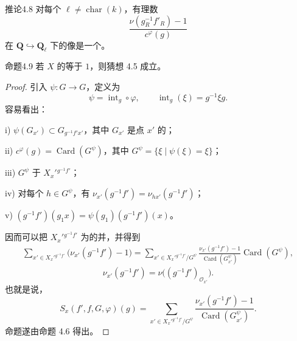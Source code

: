 \begin{SGAresult}{推论}{4.8}
对每个 $\ell\ne\operatorname{char}(k)$，有理数
\[
\frac{\nu(g_R^{-1}f'_R)-1}{c^\varphi(g)}
\]
在 $\mathbf Q\hookrightarrow\mathbf Q_\ell$ 下的像是一个。
\end{SGAresult}

\begin{SGAresult}{命题}{4.9}
若 $X$ 的等于 $1$，则猜想 4.5 成立。
\end{SGAresult}
\begin{proof}
引入 $\psi:G\longrightarrow G$，定义为
\[
\psi=\operatorname{int}_g\circ\varphi,\qquad
\operatorname{int}_g(\xi)=g^{-1}\xi g.
\]
容易看出：

\textup{i)} $\psi(G_{x'})\subset G_{g^{-1}f'x'}$，其中 $G_{x'}$ 是点 $x'$ 的；

\textup{ii)} $c^\varphi(g)=\operatorname{Card}(G^\psi)$，其中
$G^\psi=\{\xi\mid\psi(\xi)=\xi\}$；

\textup{iii)} $G^\psi$ 于 $X_x'{}^{g^{-1}f'}$；

\textup{iv)} 对每个 $h\in G^\psi$，有
$\nu_{x'}(g^{-1}f')=\nu_{hx'}(g^{-1}f')$；

\textup{v)} $(g^{-1}f')(g_1x)=\psi(g_1)(g^{-1}f')(x)$。

因而可以把 $X_x'{}^{g^{-1}f'}$ 为的并，并得到
\[
\begin{aligned}
\sum_{x'\in X_x'{}^{g^{-1}f'}}\bigl(\nu_{x'}(g^{-1}f')-1\bigr)
=\sum_{x'\in X_x'{}^{g^{-1}f'}/G^\psi}
 \frac{\nu_{x'}(g^{-1}f')-1}{\operatorname{Card}(G_{x'}^\psi)}
 \operatorname{Card}(G^\psi),
\end{aligned}
\tag{4.9.1}
\]
\[
\nu_{x'}(g^{-1}f')=\nu\bigl((g^{-1}f')_{\mathscr O_{x'}}\bigr).
\]
也就是说，
\[
S_x(f',f,G,\varphi)(g)
=\sum_{x'\in X_x'{}^{g^{-1}f'}/G^\psi}
 \frac{\nu_{x'}(g^{-1}f')-1}{\operatorname{Card}(G_{x'}^\psi)}.
\tag{4.9.2}
\]
命题遂由命题 4.6 得出。
\end{proof}

